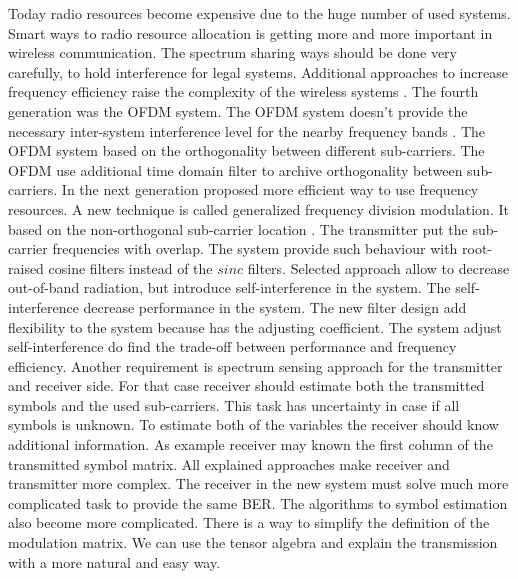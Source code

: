 
Today radio resources become expensive due to the huge number of used systems. Smart ways to radio resource allocation is getting more and more important in wireless communication. The spectrum sharing ways should be done very carefully, to hold interference for legal systems. Additional approaches to increase frequency efficiency raise the complexity of the wireless systems \cite{Book32}. 
The fourth generation was the OFDM system. The OFDM system doesn't provide the necessary inter-system interference level for the nearby frequency bands \cite{Book34}\cite{Book35}. The OFDM system based on the orthogonality between different sub-carriers. The OFDM use additional time domain filter to archive orthogonality between sub-carriers.  In the next generation proposed more efficient way to use frequency resources. A new technique  is called generalized frequency division modulation. It based on the non-orthogonal sub-carrier location \cite{Book34} \cite{Book33}. The transmitter put the sub-carrier frequencies with overlap. The system provide such behaviour with root-raised cosine filters instead of the $sinc$ filters. Selected approach allow to decrease out-of-band radiation, but introduce self-interference in the system. The self-interference decrease performance in the system.  The new filter design add flexibility to the system because has the adjusting coefficient. The system adjust self-interference do find the trade-off between performance and frequency efficiency. Another requirement is spectrum sensing approach for the transmitter and receiver side. For that case receiver should estimate both the transmitted symbols and the used sub-carriers. This task has uncertainty in case if all symbols is unknown. To estimate both of the variables the receiver should know additional information. As example receiver may known the first column of the transmitted symbol matrix. All explained approaches make receiver and transmitter more complex. The receiver in the new system must solve much more complicated task to provide the same BER. The algorithms to symbol estimation also become more complicated.   There is a way to simplify the definition of the modulation matrix. We can use the tensor algebra and explain the transmission with a more natural and easy way. 
